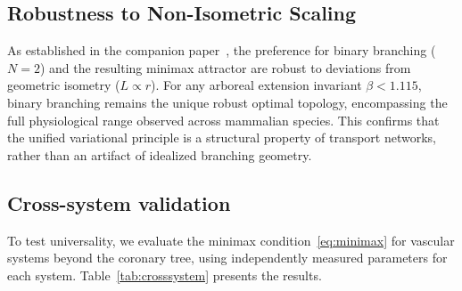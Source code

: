 \documentclass[11pt,a4paper]{article}
\theoremstyle{remark}
\begin{document}
\subsection{Robustness to Non-Isometric Scaling}
\label{sec:non-isometric}
As established in the companion paper~\cite{Marchesi2026static}, the preference
for binary branching ($N=2$) and the resulting minimax attractor are robust to
deviations from geometric isometry ($L \propto r$). For any arboreal extension
invariant $\beta < 1.115$, binary branching remains the unique robust optimal
topology, encompassing the full physiological range observed across mammalian
species. This confirms that the unified variational principle is a structural
property of transport networks, rather than an artifact of idealized branching
geometry.

\subsection{Cross-system validation}

To test universality, we evaluate the minimax
condition~\eqref{eq:minimax} for vascular systems beyond the coronary
tree, using independently measured parameters for each system.
Table~\ref{tab:crosssystem} presents the results.
\end{document}
